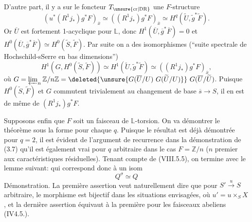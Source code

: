D'autre part, il y a sur le foncteur $T_{\unsure{\mathrm{cr}|\mathrm{DR}}}$ une $F$-structure
\[
(u^*(R^1j_*)g^*F)_{\overline x}\simeq((R^1j_*)g^*F)_{\overline x}\simeq H^q(\widetilde U,\widetilde g^*\widetilde F).
\]
Or $\overline U$ est fortement 1-acyclique pour $\mathbb L$, donc $H^1(\overline U,\overline g^*\overline F)=0$ et $H^0(\overline U,\overline g^*\overline F)\simeq H^0(\widetilde S,\widetilde F)$. Par suite on a des isomorphismes (``suite spectrale de Hochschild-sSerre en bas dimensions'')
\[
H^1(G,H^0(\widetilde S,\widetilde F))\simeq H^1(\widetilde U,\widetilde g^*\widetilde F)\simeq((R^1j_*)g^*F)_{\overline x},
\]
où $G=\varprojlim_n\mathbb Z/n\mathbb Z=\deleted{\unsure{G(\overline U/U)\ G(\widetilde U/U)}}\ G(\overline U/\widetilde U)$. Puisque $H^0(\widetilde S,\widetilde F)$  et $G$ commutent trivialement au changement de base $\overline s\longrightarrow S$, il en est de même de $(R^1j_*)g^*F$.

Supposons enfin que $F$ soit un faisceau de  $\mathbb L$-torsion. On va démontrer le théorème sous la forme
\diagram{\[
\begin{tikzcd}
{u'}^*(R^qi^!)g^*F\arrow[r,"\sim"]&(R^q{i'}^!){g'}^*u^*F
\end{tikzcd}
\]}
pour chaque $q$. Puisque le résultat est déjà démontrée pour $q=2$, il est évident de l'argument de recurrence dans la démonstration de (3.7)  qu'il est  également vrai pour $q$ arbitraire dans le cas $F=\mathbb Z/n$ ($n$ premier aux caractéristiques résiduelles). Tenant compte de (VIII.5.5), on termine avec le lemme suivant:
qui correspond donc à un isom
\[
\boxed{Q^\sigma\simeq Q}
\]
Démonstration. La première assertion veut naturellement dire que pour $S'\xrightarrow{u}S$ arbitraire, le morphisme
\diagram{\[
\begin{tikzcd}
{u'}^*(R^qj_*)g^*F\arrow[r]&(R^qj'_*){g'}^*u^*F
\end{tikzcd}
\]}
est bijectif dans les situations envisagées, où $u'=u\times_S X$, et la dernière assertion équivaut à la première pour les faisceaux abeliens (IV4.5.).

